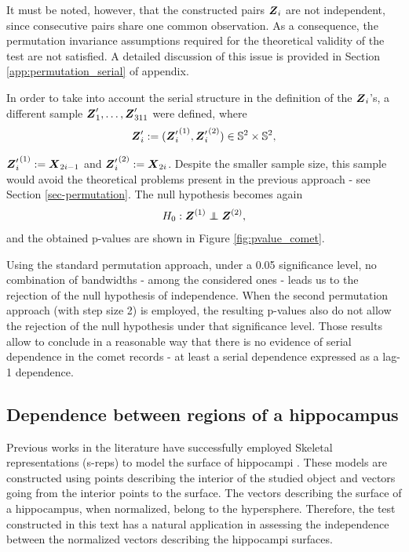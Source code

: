 \documentclass[oneside,11pt]{article}
\begin{document}
It must be noted, however, that the constructed pairs $\boldsymbol{Z}_i$ are not independent, since consecutive pairs share one common observation. As a consequence, the permutation invariance assumptions required for the theoretical validity of the test are not satisfied. A detailed discussion of this issue is provided in Section \ref{app:permutation_serial} of appendix.

In order to take into account the serial structure in the definition of the $\boldsymbol{Z}_i$'s, a different sample $\boldsymbol{Z}'_1, \dots, \boldsymbol{Z}'_{311}$ were defined, where
\begin{align*}
    \boldsymbol{Z}'_i := ({\boldsymbol{Z}'_i}^{(1)}, {\boldsymbol{Z}'_i}^{(2)}) \in \mathbb{S}^{2} \times \mathbb{S}^{2},
\end{align*}

${\boldsymbol{Z}'_i}^{(1)} := \boldsymbol{X}_{2i-1}$ and ${\boldsymbol{Z}'_i}^{(2)} := \boldsymbol{X}_{2i}$. Despite the smaller sample size, this sample would avoid the theoretical problems present in the previous approach - see Section \ref{sec-permutation}. The null hypothesis becomes again
\begin{align*}
    H_0: \bZ^{(1)} \independent \bZ^{(2)},
\end{align*}
and the obtained p-values are shown in Figure \ref{fig:pvalue_comet}.

Using the standard permutation approach, under a 0.05 significance level, no combination of bandwidths - among the considered ones - leads us to the rejection of the null hypothesis of independence. When the second permutation approach (with step size 2) is employed, the resulting p-values also do not allow the rejection of the null hypothesis under that significance level. Those results allow to conclude in a reasonable way that there is no evidence of serial dependence in the comet records - at least a serial dependence expressed as a lag-1 dependence.

\subsection{Dependence between regions of a hippocampus}

Previous works in the literature have successfully employed Skeletal representations (s-reps) to model the surface of hippocampi \citep{Garcia-Portugues2023hippocampus, Garcia-Portugues2024}. These models are constructed using points describing the interior of the studied object and vectors going from the interior points to the surface. The vectors describing the surface of a hippocampus, when normalized, belong to the hypersphere. Therefore, the test constructed in this text has a natural application in assessing the independence between the normalized vectors describing the hippocampi surfaces.
\end{document}
